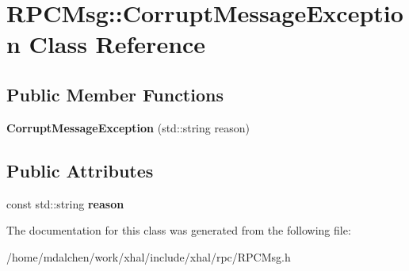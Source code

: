 \hypertarget{classRPCMsg_1_1CorruptMessageException}{
\section{RPCMsg::CorruptMessageException Class Reference}
\label{classRPCMsg_1_1CorruptMessageException}
}
\subsection*{Public Member Functions}
\begin{DoxyCompactItemize}
\item 
\hypertarget{classRPCMsg_1_1CorruptMessageException_adfcd4d61ce8e0c18e988b7bcb0241329}{
{\bfseries CorruptMessageException} (std::string reason)}
\label{classRPCMsg_1_1CorruptMessageException_adfcd4d61ce8e0c18e988b7bcb0241329}

\end{DoxyCompactItemize}
\subsection*{Public Attributes}
\begin{DoxyCompactItemize}
\item 
\hypertarget{classRPCMsg_1_1CorruptMessageException_a90e9eb46b36a25bfb736a045600ed853}{
const std::string {\bfseries reason}}
\label{classRPCMsg_1_1CorruptMessageException_a90e9eb46b36a25bfb736a045600ed853}

\end{DoxyCompactItemize}


The documentation for this class was generated from the following file:\begin{DoxyCompactItemize}
\item 
/home/mdalchen/work/xhal/include/xhal/rpc/RPCMsg.h\end{DoxyCompactItemize}
